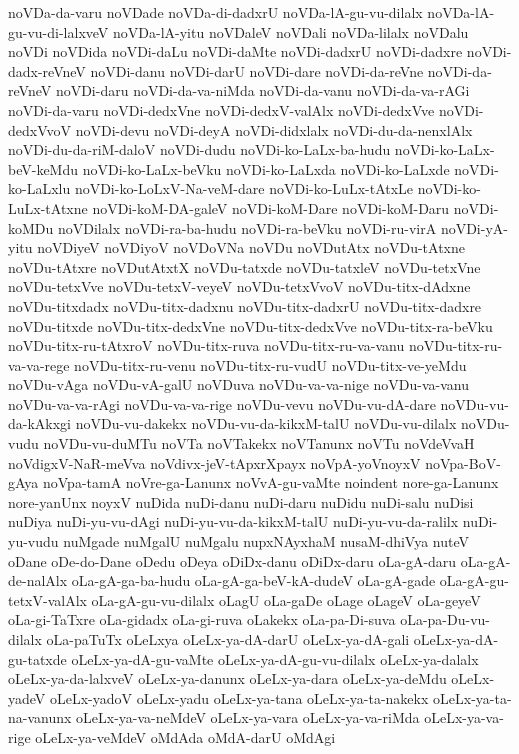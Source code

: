 {noVDa-da-varu
noVDade
noVDa-di-dadxrU
noVDa-lA-gu-vu-dilalx
noVDa-lA-gu-vu-di-lalxveV
noVDa-lA-yitu
noVDaleV
noVDali
noVDa-lilalx
noVDalu
noVDi
noVDida
noVDi-daLu
noVDi-daMte
noVDi-dadxrU
noVDi-dadxre
noVDi-dadx-reVneV
noVDi-danu
noVDi-darU
noVDi-dare
noVDi-da-reVne
noVDi-da-reVneV
noVDi-daru
noVDi-da-va-niMda
noVDi-da-vanu
noVDi-da-va-rAGi
noVDi-da-varu
noVDi-dedxVne
noVDi-dedxV-valAlx
noVDi-dedxVve
noVDi-dedxVvoV
noVDi-devu
noVDi-deyA
noVDi-didxlalx
noVDi-du-da-nenxlAlx
noVDi-du-da-riM-daloV
noVDi-dudu
noVDi-ko-LaLx-ba-hudu
noVDi-ko-LaLx-beV-keMdu
noVDi-ko-LaLx-beVku
noVDi-ko-LaLxda
noVDi-ko-LaLxde
noVDi-ko-LaLxlu
noVDi-ko-LoLxV-Na-veM-dare
noVDi-ko-LuLx-tAtxLe
noVDi-ko-LuLx-tAtxne
noVDi-koM-DA-galeV
noVDi-koM-Dare
noVDi-koM-Daru
noVDi-koMDu
noVDilalx
noVDi-ra-ba-hudu
noVDi-ra-beVku
noVDi-ru-virA
noVDi-yA-yitu
noVDiyeV
noVDiyoV
noVDoVNa
noVDu
noVDutAtx
noVDu-tAtxne
noVDu-tAtxre
noVDutAtxtX
noVDu-tatxde
noVDu-tatxleV
noVDu-tetxVne
noVDu-tetxVve
noVDu-tetxV-veyeV
noVDu-tetxVvoV
noVDu-titx-dAdxne
noVDu-titxdadx
noVDu-titx-dadxnu
noVDu-titx-dadxrU
noVDu-titx-dadxre
noVDu-titxde
noVDu-titx-dedxVne
noVDu-titx-dedxVve
noVDu-titx-ra-beVku
noVDu-titx-ru-tAtxroV
noVDu-titx-ruva
noVDu-titx-ru-va-vanu
noVDu-titx-ru-va-va-rege
noVDu-titx-ru-venu
noVDu-titx-ru-vudU
noVDu-titx-ve-yeMdu
noVDu-vAga
noVDu-vA-galU
noVDuva
noVDu-va-va-nige
noVDu-va-vanu
noVDu-va-va-rAgi
noVDu-va-va-rige
noVDu-vevu
noVDu-vu-dA-dare
noVDu-vu-da-kAkxgi
noVDu-vu-dakekx
noVDu-vu-da-kikxM-talU
noVDu-vu-dilalx
noVDu-vudu
noVDu-vu-duMTu
noVTa
noVTakekx
noVTanunx
noVTu
noVdeVvaH
noVdigxV-NaR-meVva
noVdivx-jeV-tApxrXpayx
noVpA-yoVnoyxV
noVpa-BoV-gAya
noVpa-tamA
noVre-ga-Lanunx
noVvA-gu-vaMte
noindent
nore-ga-Lanunx
nore-yanUnx
noyxV
nuDida
nuDi-danu
nuDi-daru
nuDidu
nuDi-salu
nuDisi
nuDiya
nuDi-yu-vu-dAgi
nuDi-yu-vu-da-kikxM-talU
nuDi-yu-vu-da-ralilx
nuDi-yu-vudu
nuMgade
nuMgalU
nuMgalu
nupxNAyxhaM
nusaM-dhiVya
nuteV
oDane
oDe-do-Dane
oDedu
oDeya
oDiDx-danu
oDiDx-daru
oLa-gA-daru
oLa-gA-de-nalAlx
oLa-gA-ga-ba-hudu
oLa-gA-ga-beV-kA-dudeV
oLa-gA-gade
oLa-gA-gu-tetxV-valAlx
oLa-gA-gu-vu-dilalx
oLagU
oLa-gaDe
oLage
oLageV
oLa-geyeV
oLa-gi-TaTxre
oLa-gidadx
oLa-gi-ruva
oLakekx
oLa-pa-Di-suva
oLa-pa-Du-vu-dilalx
oLa-paTuTx
oLeLxya
oLeLx-ya-dA-darU
oLeLx-ya-dA-gali
oLeLx-ya-dA-gu-tatxde
oLeLx-ya-dA-gu-vaMte
oLeLx-ya-dA-gu-vu-dilalx
oLeLx-ya-dalalx
oLeLx-ya-da-lalxveV
oLeLx-ya-danunx
oLeLx-ya-dara
oLeLx-ya-deMdu
oLeLx-yadeV
oLeLx-yadoV
oLeLx-yadu
oLeLx-ya-tana
oLeLx-ya-ta-nakekx
oLeLx-ya-ta-na-vanunx
oLeLx-ya-va-neMdeV
oLeLx-ya-vara
oLeLx-ya-va-riMda
oLeLx-ya-va-rige
oLeLx-ya-veMdeV
oMdAda
oMdA-darU
oMdAgi
}
